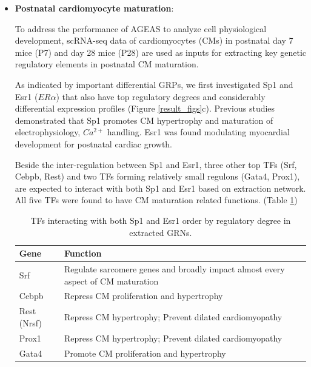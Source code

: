\documentclass[fleqn,10pt]{wlscirep}
\begin{document}
\begin{itemize}


      \item {\textbf{Postnatal cardiomyocyte maturation}}:

        To address the performance of AGEAS to analyze cell physiological development, scRNA-seq data of cardiomyocytes (CMs) in postnatal day 7 mice (P7) and day 28 mice (P28) are used as inputs for extracting key genetic regulatory elements in postnatal CM maturation.

        As indicated by important differential GRPs, we first investigated Sp1 and Esr1 ($ER\alpha$) that also have top regulatory degrees and considerably differential expression profiles (Figure \ref{result_figs}c).
        Previous studies demonstrated that Sp1 promotes CM hypertrophy \cite{sp1_hypertrophy} and maturation of electrophysiology, $Ca^{2+}$ handling. \cite{Sp1_electrophysiologt, CM_mature}
        Esr1 was found modulating myocardial development for postnatal cardiac growth.\cite{esr1_cm, esr1_cm_growth}

        Beside the inter-regulation between Sp1 and Esr1, three other top TFs (Srf, Cebpb, Rest) and two TFs forming relatively small regulons (Gata4, Prox1), are expected to interact with both Sp1 and Esr1 based on extraction network.
        All five TFs were found to have CM maturation related functions. (Table \ref{interact_TFs})

        \begin{table}[ht]
            \centering
            \begin{tabular}{|l|l|}
              \hline
              \textbf{Gene} & \textbf{Function}  \\
              \hline
              Srf & Regulate sarcomere genes and broadly impact almost every aspect of CM maturation\cite{CM_mature} \\
              \hline
              Cebpb & Repress CM proliferation and hypertrophy\cite{cebpb_1, cebpb_2}\\
              \hline
              Rest (Nrsf) & Repress CM hypertrophy; Prevent dilated cardiomyopathy\cite{rest_1}\\
              \hline
              Prox1 & Repress CM hypertrophy; Prevent dilated cardiomyopathy\cite{prox1_CM} \\
              \hline
              Gata4 & Promote CM proliferation and hypertrophy\cite{CM_posnatal_mature} \\
              \hline
            \end{tabular}
            \caption{
              \label{interact_TFs}
              TFs interacting with both Sp1 and Esr1 order by regulatory degree in extracted GRNs.
            }
        \end{table}


\end{itemize}
\end{document}
